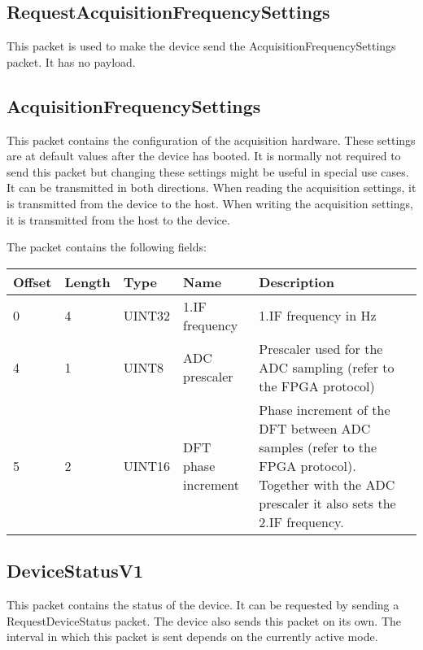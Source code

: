 \documentclass[a4paper,11pt]{article}
\begin{document}
\subsection{RequestAcquisitionFrequencySettings}
This packet is used to make the device send the AcquisitionFrequencySettings packet. It has no payload.

\subsection{AcquisitionFrequencySettings}
This packet contains the configuration of the acquisition hardware. These settings are at default values after the device has booted. It is normally not required to send this packet but changing these settings might be useful in special use cases. It can be transmitted in both directions. When reading the acquisition settings, it is transmitted from the device to the host. When writing the acquisition settings, it is transmitted from the host to the device.

The packet contains the following fields:
\begin{ThreePartTable}
\setlength\tabcolsep{3pt}

\begin{longtable}{p{} |  p{}  |  p{}| p{} | p{}}
\toprule
\textbf{Offset} &\textbf{Length} &\textbf{Type} & \textbf{Name} &\textbf{Description} \\ 
\hline
\endhead
\midrule[\heavyrulewidth]
\endfoot  
\midrule[\heavyrulewidth]
\endlastfoot

0 & 4 & UINT32 & 1.IF frequency & 1.IF frequency in Hz \\
4 & 1 & UINT8 & ADC prescaler & Prescaler used for the ADC sampling (refer to the FPGA protocol) \\
5 & 2 & UINT16 & DFT phase increment & Phase increment of the DFT between ADC samples (refer to the FPGA protocol). Together with the ADC prescaler it also sets the 2.IF frequency. \\
\end{longtable}   
\end{ThreePartTable}

\subsection{DeviceStatusV1}
This packet contains the status of the device. It can be requested by sending a RequestDeviceStatus packet. The device also sends this packet on its own. The interval in which this packet is sent depends on the currently active mode.
\end{document}
